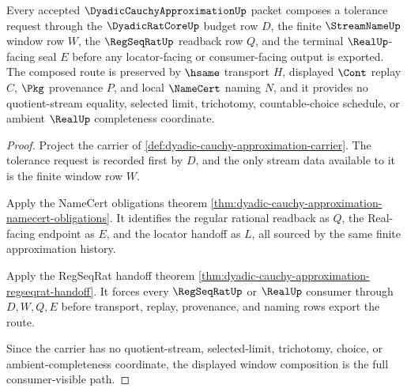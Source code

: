 \begin{theorem}
\label{thm:dyadic-cauchy-approximation-window-composition}
Every accepted $\DyadicCauchyApproximationUp$ packet composes a tolerance request through the $\DyadicRatCoreUp$ budget row $D$, the finite $\StreamNameUp$ window row $W$, the $\RegSeqRatUp$ readback row $Q$, and the terminal $\RealUp$-facing seal $E$ before any locator-facing or consumer-facing output is exported. The composed route is preserved by $\hsame$ transport $H$, displayed $\Cont$ replay $C$, $\Pkg$ provenance $P$, and local $\NameCert$ naming $N$, and it provides no quotient-stream equality, selected limit, trichotomy, countable-choice schedule, or ambient $\RealUp$ completeness coordinate.
\end{theorem}
\begin{proof}
Project the carrier of \autoref{def:dyadic-cauchy-approximation-carrier}. The tolerance request is recorded first by $D$, and the only stream data available to it is the finite window row $W$.

Apply the NameCert obligations theorem \autoref{thm:dyadic-cauchy-approximation-namecert-obligations}. It identifies the regular rational readback as $Q$, the Real-facing endpoint as $E$, and the locator handoff as $L$, all sourced by the same finite approximation history.

Apply the RegSeqRat handoff theorem \autoref{thm:dyadic-cauchy-approximation-regseqrat-handoff}. It forces every $\RegSeqRatUp$ or $\RealUp$ consumer through $D,W,Q,E$ before transport, replay, provenance, and naming rows export the route.

Since the carrier has no quotient-stream, selected-limit, trichotomy, choice, or ambient-completeness coordinate, the displayed window composition is the full consumer-visible path.
\end{proof}




